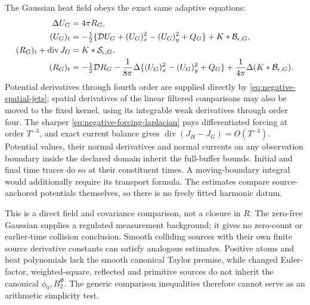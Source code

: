 The Gaussian heat field obeys the exact same adaptive equations:
\begin{align}
 \Delta U_G&=4\pi R_G,\notag\\
 (U_G)_t&=-\tfrac12\{\mathcal D U_G+(U_G)_x^2-(U_G)_y^2+Q_G\}
                         +K*\mathcal B_{\epsilon,G},\notag\\
 (R_G)_t+\operatorname{div}J_G&=K*\mathcal S_{\epsilon,G},
 \label{eq:negative-Gaussian-evolution}\\
 (R_G)_t&=-\tfrac12\mathcal D R_G
 -\frac1{8\pi}\Delta\{(U_G)_x^2-(U_G)_y^2+Q_G\}
 +\frac1{4\pi}\Delta(K*\mathcal B_{\epsilon,G}).
 \notag
\end{align}
Potential derivatives through fourth order are supplied directly by
\eqref{eq:negative-spatial-jets}; spatial derivatives of the linear
filtered comparisons may also be moved to the fixed kernel, using its
integrable weak derivatives through order four. The sharper
\eqref{eq:negative-forcing-laplacian} pays differentiated forcing at
order $T^{-3}$, and exact current balance gives
$\operatorname{div}(J_H-J_G)=O(T^{-3})$.
Potential values, their normal derivatives and normal currents on any
observation boundary inside the declared domain inherit the full-buffer
bounds. Initial and final time traces do so at their constituent times.
A moving-boundary integral would additionally require its transport
formula. The estimates compare source-anchored potentials themselves,
so there is no freely fitted harmonic datum.

This is a direct field and covariance comparison, not a closure in $R$.
The zero-free Gaussian supplies a regulated measurement background;
it gives no zero-count or earlier-time collision conclusion.
Smooth colliding sources with their own finite source derivative
constants can satisfy analogous estimates. Positive atoms and heat
polynomials lack the smooth canonical Taylor premise, while changed
Euler-factor, weighted-square, reflected and primitive sources do not
inherit the canonical $\phi_0,B_2^{\Phi}$. The generic comparison
inequalities therefore cannot serve as an arithmetic simplicity test.
